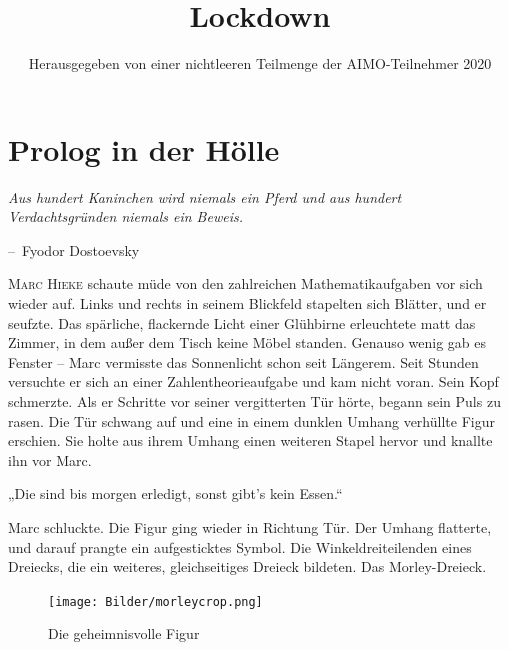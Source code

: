 \documentclass[oneside]{memoir}
\title{Lockdown}
\author{Herausgegeben von einer nichtleeren Teilmenge der AIMO-Teilnehmer 2020}
\makeatletter
\newenvironment{chapquote}[2][2em]
  {\setlength{\@tempdima}{#1}%
   \def\chapquote@author{#2}%
   \parshape 1 \@tempdima \dimexpr\textwidth-2\@tempdima\relax%
   \itshape}
  {\par\normalfont\hfill--\ \chapquote@author\hspace*{\@tempdima}\par\bigskip}
\makeatother
\begin{document}
\begin{titlingpage}
\maketitle
\end{titlingpage}
\newpage
\thispagestyle{empty}
\begin{center}
\end{center}
\setcounter{page}{2}
\chapter{Prolog in der Hölle}

\begin{chapquote}{Fyodor Dostoevsky}
\glqq Aus hundert Kaninchen wird niemals ein Pferd und aus hundert Verdachtsgründen niemals ein Beweis.\grqq
\end{chapquote}

\lettrine{M}{arc Hieke} schaute müde von den zahlreichen Mathematikaufgaben vor sich wieder auf. Links und rechts in seinem Blickfeld stapelten sich Blätter, und er seufzte. Das spärliche, flackernde Licht einer Glühbirne erleuchtete matt das Zimmer, in dem außer dem Tisch keine Möbel standen. Genauso wenig gab es Fenster -- Marc vermisste das Sonnenlicht schon seit Längerem. Seit Stunden versuchte er sich an einer Zahlentheorieaufgabe und kam nicht voran. Sein Kopf schmerzte. Als er Schritte vor seiner vergitterten Tür hörte, begann sein Puls zu rasen. Die Tür schwang auf und eine in einem dunklen Umhang verhüllte Figur erschien. Sie holte aus ihrem Umhang einen weiteren Stapel hervor und knallte ihn vor Marc.

„Die sind bis morgen erledigt, sonst gibt's kein Essen.“

Marc schluckte. Die Figur ging wieder in Richtung Tür. Der Umhang flatterte, und darauf prangte ein aufgesticktes Symbol. Die Winkeldreiteilenden eines Dreiecks, die ein weiteres, gleichseitiges Dreieck bildeten. Das Morley-Dreieck.

\begin{figure}[htbp] 
  \centering
     \texttt{[image: Bilder/morleycrop.png]}
  \caption{Die geheimnisvolle Figur}
\end{figure}
\end{document}
